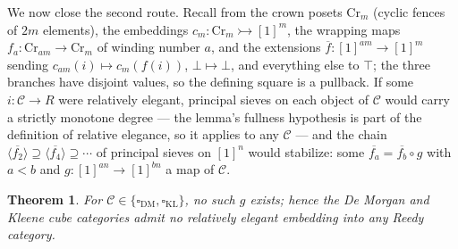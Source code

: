 \documentclass[11pt]{amsart}
\newtheorem{thm}{Theorem}[section]
\theoremstyle{definition}
\newcommand{\cube}{\square_{\mathrm{DM}}}
\newcommand{\cubeK}{\square_{\mathrm{KL}}}
\newcommand{\Crown}{\mathrm{Cr}}
\begin{document}
We now close the second route.  Recall from
\cite[App.~A]{CavalloSattlerElegance} the crown posets $\Crown_m$
(cyclic fences of $2m$ elements), the embeddings
$c_m : \Crown_m \rightarrowtail [1]^m$, the wrapping maps
$f_a : \Crown_{am} \to \Crown_m$ of winding number $a$, and the
extensions $\overline{f} : [1]^{am} \to [1]^{m}$ sending
$c_{am}(i) \mapsto c_m(f(i))$, $\bot \mapsto \bot$, and everything
else to $\top$; the three branches have disjoint values, so the
defining square is a pullback.  If some
$i : \mathcal{C} \to R$ were relatively elegant, principal sieves
on each object of $\mathcal{C}$ would carry a strictly monotone
degree \cite[Lem.~A.5]{CavalloSattlerElegance} --- the lemma's
fullness hypothesis is part of the definition of relative
elegance, so it applies to any $\mathcal{C}$ --- and the chain
$\langle\overline{f_2}\rangle \supseteq
\langle\overline{f_4}\rangle \supseteq \cdots$ of principal sieves
on $[1]^n$ would stabilize: some
$\overline{f_a} = \overline{f_b} \circ g$ with $a < b$ and
$g : [1]^{an} \to [1]^{bn}$ a map of $\mathcal{C}$.

\begin{thm}
  \label{thm:crown}
  For $\mathcal{C} \in \{\cube, \cubeK\}$, no such $g$ exists;
  hence the De Morgan and Kleene cube categories admit no
  relatively elegant embedding into any Reedy category.
\end{thm}
\end{document}
